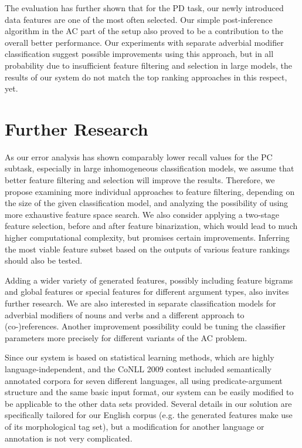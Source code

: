 \documentclass[12pt,notitlepage]{report}
\begin{document}
The evaluation has further shown that for the PD task, our newly introduced data features are one of the most often selected. Our simple post-inference algorithm in the AC part of the setup also proved to be a contribution to the overall better performance. Our experiments with separate adverbial modifier classification suggest possible improvements using this approach, but in all probability due to insufficient feature filtering and selection in large models, the results of our system do not match the top ranking approaches in this respect, yet.

\section{Further Research}\label{further-work}

As our error analysis has shown comparably lower recall values for the PC subtask, especially in large inhomogeneous classification models, we assume that better feature filtering and selection will improve the results. Therefore, we propose examining more individual approaches to feature filtering, depending on the size of the given classification model, and analyzing the possibility of using more exhaustive feature space search. We also consider applying a two-stage feature selection, before and after feature binarization, which would lead to much higher computational complexity, but promises certain improvements. Inferring the most viable feature subset based on the outputs of various feature rankings should also be tested.

Adding a wider variety of generated features, possibly including feature bigrams and global features \citep{nugues09} or special features for different argument types, also invites further research. We are also interested in separate classification models for adverbial modifiers of nouns and verbs and a different approach to (co-)references. Another improvement possibility could be tuning the classifier parameters more precisely for different variants of the AC problem.

Since our system is based on statistical learning methods, which are highly language-independent, and the CoNLL 2009 contest included semantically annotated corpora for seven different languages, all using predicate-argument structure and the same basic input format, our system can be easily modified to be applicable to the other data sets provided. Several details in our solution are specifically tailored for our English corpus (e.g. the generated features make use of its morphological tag set), but a modification for another language or annotation is not very complicated.
\end{document}
